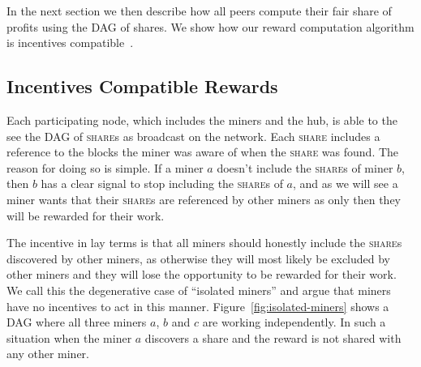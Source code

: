 \documentclass{article}
\begin{document}
In the next section we then describe how all peers compute their fair
share of profits using the DAG of shares. We show how our reward
computation algorithm is incentives
compatible~\cite{incentives-compatible}.

  
  
\subsection{Incentives Compatible Rewards}\label{sec:rewards}

Each participating node, which includes the miners and the hub, is
able to the see the DAG of \textsc{share}s as broadcast on the
network. Each \textsc{share} includes a reference to the blocks the
miner was aware of when the \textsc{share} was found. The reason for
doing so is simple. If a miner $a$ doesn't include the \textsc{share}s
of miner $b$, then $b$ has a clear signal to stop including the
\textsc{share}s of $a$, and as we will see a miner wants that their
\textsc{share}s are referenced by other miners as only then they will
be rewarded for their work.

The incentive in lay terms is that all miners should honestly include
the \textsc{share}s discovered by other miners, as otherwise they will
most likely be excluded by other miners and they will lose the
opportunity to be rewarded for their work. We call this the
degenerative case of ``isolated miners'' and argue that miners have no
incentives to act in this manner. Figure~\ref{fig:isolated-miners}
shows a DAG where all three miners $a$, $b$ and $c$ are working
independently. In such a situation when the miner $a$ discovers a
share and the reward is not shared with any other miner.
\end{document}
